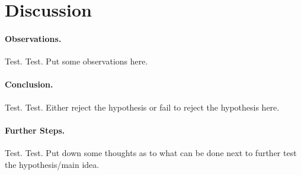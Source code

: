 \documentclass[11pt]{article}
\numberwithin{equation}{section}
\begin{document}
\section{Discussion}

\paragraph{Observations.}
Test. Test. Put some observations here.

\paragraph{Conclusion.}
Test. Test. Either reject the hypothesis or fail to reject the hypothesis here.

\paragraph{Further Steps.}
Test. Test. Put down some thoughts as to what can be done next to further test the hypothesis/main idea.




\end{document}
